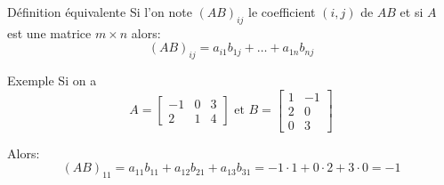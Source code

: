 \documentclass[a4paper]{article}
\begin{document}
\begin{parag}{Définition équivalente}
    Si l'on note $\left(AB\right)_{ij}$ le coefficient $\left(i, j\right)$ de $AB$ et si $A$ est une matrice $m \times n$ alors:
    \[\left(AB\right)_{ij} = a_{i1} b_{1j} + \ldots + a_{1n} b_{nj}\]
\end{parag}

\begin{parag}{Exemple}
    Si on a
    \[A = \begin{bmatrix} -1 & 0 & 3 \\ 2 & 1 & 4 \end{bmatrix} \text{ et } B = \begin{bmatrix} 1 & -1 \\ 2 & 0 \\ 0 & 3 \end{bmatrix} \]

    Alors:
    \[\left(AB\right)_{11} = a_{11} b_{11} + a_{12} b_{21} + a_{13} b_{31} = -1\cdot 1 + 0\cdot 2 + 3\cdot 0 = -1\]




\end{parag}
\end{document}
